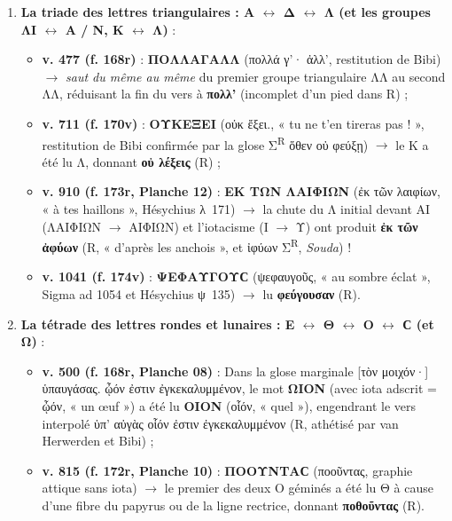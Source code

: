 \documentclass[11pt, a4paper, twoside]{article}
\renewcommand{\_}{\origunderscore\penalty0\relax}
\renewcommand{\texttt}[1]{#1}
\newcommand{\R}{\textbf{R}}
\newcommand{\Bibi}{\textit{Bibi}}
\newcommand{\SigmaSchol}{\textgreek{Σ}}
\def\R{R}%
\def\Bibi{Bibi}%
\def\SigmaSchol{Sigma}%
\begin{document}
\begin{enumerate}[leftmargin=1.6em, itemsep=2pt]
  \item \textbf{La triade des lettres triangulaires : \texttt{Α} $\leftrightarrow$ \texttt{Δ} $\leftrightarrow$ \texttt{Λ} (et les groupes \texttt{ΛΙ} $\leftrightarrow$ \texttt{Α} / \texttt{Ν}, \texttt{Κ} $\leftrightarrow$ \texttt{Λ})} :
  \begin{itemize}[leftmargin=1.5em, itemsep=2pt]
    \item \textbf{v. 477 (\texttt{f. 168r})} : \textbf{\texttt{ΠΟΛΛΑΓΑΛΛ}} (\texttt{πολλά γ'· ἀλλ'}, restitution de \Bibi{}) $\to$ \textit{saut du même au même} du premier groupe triangulaire \texttt{ΛΛ} au second \texttt{ΛΛ}, réduisant la fin du vers à \textbf{\texttt{πολλ'}} (incomplet d'un pied dans \R{}) ;
    \item \textbf{v. 711 (\texttt{f. 170v})} : \textbf{\texttt{ΟΥΚΕΞΕΙ}} (\texttt{οὐκ ἔξει.}, « tu ne t'en tireras pas ! », restitution de \Bibi{} confirmée par la glose Σ\textsuperscript{R} \texttt{ὅθεν οὐ φεύξῃ}) $\to$ le \texttt{Κ} a été lu \texttt{Λ}, donnant \textbf{\texttt{οὐ λέξεις}} (\R{}) ;
    \item \textbf{v. 910 (\texttt{f. 173r}, Planche 12)} : \textbf{\texttt{ΕΚ ΤΩΝ ΛΑΙΦΙΩΝ}} (\texttt{ἐκ τῶν λαιφίων}, « à tes haillons », Hésychius λ~171) $\to$ la chute du \texttt{Λ} initial devant \texttt{ΑΙ} (\texttt{ΛΑΙΦΙΩΝ} $\to$ \texttt{ΑΙΦΙΩΝ}) et l'iotacisme (Ι $\to$ Υ) ont produit \textbf{\texttt{ἐκ τῶν ἀφύων}} (\R{}, « d'après les anchois », et \texttt{ἰφύων} Σ\textsuperscript{R}, \textit{Souda}) !
    \item \textbf{v. 1041 (\texttt{f. 174v})} : \textbf{\texttt{ΨΕΦΑΥΓΟΥϹ}} (\texttt{ψεφαυγοῦς}, « au sombre éclat », \SigmaSchol{} ad 1054 et Hésychius ψ~135) $\to$ lu \textbf{\texttt{φεύγουσαν}} (\R{}).
  \end{itemize}

  \item \textbf{La tétrade des lettres rondes et lunaires : \texttt{Ε} $\leftrightarrow$ \texttt{Θ} $\leftrightarrow$ \texttt{Ο} $\leftrightarrow$ \texttt{Ϲ} (et \texttt{Ω})} :
  \begin{itemize}[leftmargin=1.5em, itemsep=2pt]
    \item \textbf{v. 500 (\texttt{f. 168r}, Planche 08)} : Dans la glose marginale \texttt{[τὸν μοιχόν·] ὑπαυγάσας. ᾦόν ἐστιν ἐγκεκαλυμμένον}, le mot \textbf{\texttt{ΩΙΟΝ}} (avec iota adscrit = ᾦόν, « un œuf ») a été lu \textbf{\texttt{ΟΙΟΝ}} (\texttt{οἷόν}, « quel »), engendrant le vers interpolé \texttt{ὑπ' αὐγὰς οἷόν ἐστιν ἐγκεκαλυμμένον} (\R{}, athétisé par van Herwerden et \Bibi{}) ;
    \item \textbf{v. 815 (\texttt{f. 172r}, Planche 10)} : \textbf{\texttt{ΠΟΟΥΝΤΑϹ}} (\texttt{ποοῦντας}, graphie attique sans iota) $\to$ le premier des deux \texttt{Ο} géminés a été lu \texttt{Θ} à cause d'une fibre du papyrus ou de la ligne rectrice, donnant \textbf{\texttt{ποθοῦντας}} (\R{}).
  \end{itemize}


\end{enumerate}
\end{document}
